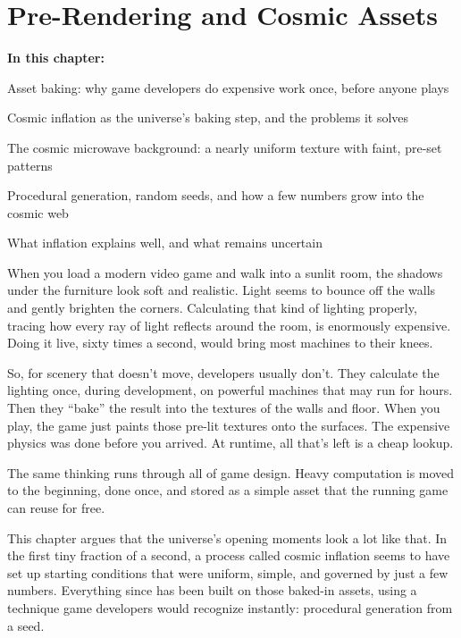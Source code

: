 \chapter{Pre-Rendering and Cosmic Assets}

\begin{chaptermapbox}
\textbf{In this chapter:}
\begin{compactchecklist}
\item Asset baking: why game developers do expensive work once, before anyone plays
\item Cosmic inflation as the universe's baking step, and the problems it solves
\item The cosmic microwave background: a nearly uniform texture with faint, pre-set patterns
\item Procedural generation, random seeds, and how a few numbers grow into the cosmic web
\item What inflation explains well, and what remains uncertain
\end{compactchecklist}
\end{chaptermapbox}

When you load a modern video game and walk into a sunlit room, the shadows under the furniture look soft and realistic. Light seems to bounce off the walls and gently brighten the corners. Calculating that kind of lighting properly, tracing how every ray of light reflects around the room, is enormously expensive. Doing it live, sixty times a second, would bring most machines to their knees.

So, for scenery that doesn't move, developers usually don't. They calculate the lighting once, during development, on powerful machines that may run for hours. Then they ``bake'' the result into the textures of the walls and floor. When you play, the game just paints those pre-lit textures onto the surfaces. The expensive physics was done before you arrived. At runtime, all that's left is a cheap lookup.

The same thinking runs through all of game design. Heavy computation is moved to the beginning, done once, and stored as a simple asset that the running game can reuse for free.

This chapter argues that the universe's opening moments look a lot like that. In the first tiny fraction of a second, a process called cosmic inflation seems to have set up starting conditions that were uniform, simple, and governed by just a few numbers. Everything since has been built on those baked-in assets, using a technique game developers would recognize instantly: procedural generation from a seed.

